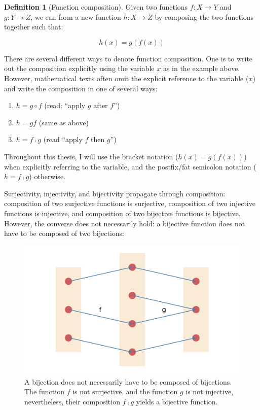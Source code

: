 \documentclass[
]{book}
\providecommand{\tightlist}{%
  \setlength{\itemsep}{0pt}\setlength{\parskip}{0pt}}
\theoremstyle{definition}
\newtheorem{definition}{Definition}[chapter]
\theoremstyle{definition}
\theoremstyle{definition}
\theoremstyle{definition}
\theoremstyle{remark}
\begin{document}
\begin{definition}[Function composition]

Given two functions \(f: X \to Y\) and \(g: Y \to Z\), we can form a new function \(h: X \to Z\) by composing the two functions together such that:

\[h(x) = g(f(x))\]

There are several different ways to denote function composition. One is to write out the composition explicitly using the variable \(x\) as in the example above. However, mathematical texts often omit the explicit reference to the variable (\(x\)) and write the composition in one of several ways:

\begin{enumerate}
\def\labelenumi{\arabic{enumi}.}
\tightlist
\item
  \(h = g \circ f\) (read: ``apply \(g\) after \(f\)'')
\item
  \(h = gf\) (same as above)
\item
  \(h = f ⨾g\) (read ``apply \(f\) then \(g\)'')
\end{enumerate}

\end{definition}

Throughout this thesis, I will use the bracket notation (\(h(x) = g(f(x))\)) when explicitly referring to the variable, and the postfix/fat semicolon notation (\(h = f ⨾g\)) otherwise.

Surjectivity, injectivity, and bijectivity propagate through composition: composition of two surjective functions is surjective, composition of two injective functions is injective, and composition of two bijective functions is bijective. However, the converse does not necessarily hold: a bijective function does not have to be composed of two bijections:

\begin{figure}

{\centering \includegraphics[width=1\linewidth,height=1\textheight]{./figures/bijection-composition} 

}

\caption{A bijection does not necessarily have to be composed of bijections. The function $f$ is not surjective, and the function $g$ is not injective, nevertheless, their composition $f ⨾g$ yields a bijective function.}\label{fig:bijection}
\end{figure}
\end{document}
